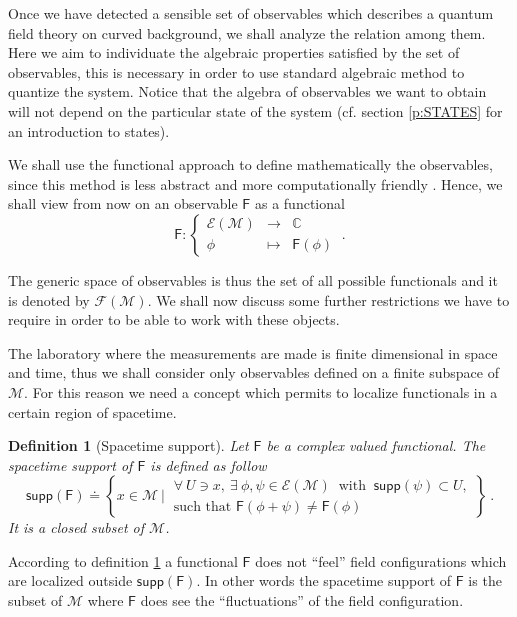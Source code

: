 \documentclass[11pt]{book}
\newcommand{\supp}{\mathsf{supp}}
\newcommand{\Ecal}{\mathcal{E}}
\newcommand{\Fcal}{\mathcal{F}}
\newcommand{\Mcal}{\mathcal{M}}
\newcommand{\Cbb}{\mathbb{C}}
\newcommand{\Fsf}{\mathsf{F}}
\theoremstyle{break}
\newtheorem{definition}{Definition}[chapter]
\begin{document}
Once we have detected a sensible set of observables which describes a quantum field theory on curved background, we shall analyze the relation among them. Here we aim to individuate the algebraic properties satisfied by the set of observables, this is necessary in order to use standard algebraic method to quantize the system. Notice that the algebra of observables we want to obtain will not depend on the particular state of the system (cf. section \ref{p:STATES} for an introduction to states).


We shall use the functional approach to define mathematically the observables, since this method is less abstract and more computationally friendly \cite{BFLR_2012,BDF_2009}. Hence, we shall view from now on an observable $\Fsf$ as a functional 
%
\begin{equation*}
\Fsf : \left\{
\begin{array}{ccc}
\Ecal(\Mcal) & \to     & \Cbb \\
\phi  & \mapsto & \Fsf(\phi)
\end{array}
\right. \ . 
\end{equation*}


The generic space of observables is thus the set of all possible functionals and it is denoted by $\Fcal(\Mcal)$. We shall now discuss some further restrictions we have to require in order to be able to work with these objects.


The laboratory where the measurements are made is finite dimensional in space and time, thus we shall consider only observables defined on a finite subspace of $\Mcal$. For this reason we need a concept which permits to localize functionals in a certain region of spacetime.


\begin{definition}[Spacetime support] \label{def:spacetime_supp}
Let $\Fsf$ be a complex valued functional. The spacetime support of $\Fsf$ is defined as follow
%
\begin{equation*}
\supp(\Fsf) \doteq \left\{ x \in \Mcal \ \bigg| \ 
\begin{array}{l}
\forall \ U \ni x , \ \exists \ \phi, \psi \in \Ecal(\Mcal) \ \mbox{ with } \ \supp(\psi) \subset U, \\
\mbox{such that } \Fsf(\phi + \psi) \neq \Fsf(\phi)
\end{array}
\right\} \ .
\end{equation*}
It is a closed subset of $\Mcal$.
%
\end{definition}


According to definition \ref{def:spacetime_supp} a functional $\Fsf$ does not ``feel'' field configurations which are localized outside $\supp(\Fsf)$. In other words the spacetime support of $\Fsf$ is the subset of $\Mcal$ where $\Fsf$ does see the ``fluctuations'' of the field configuration.
\end{document}
